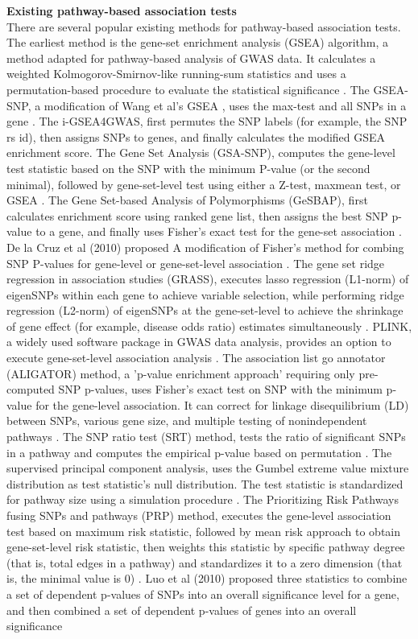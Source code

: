 \documentclass[12pt]{article}
\begin{document}
\textbf{Existing pathway-based association tests}\\
There are several popular existing methods for pathway-based association tests.  The earliest method is the gene-set enrichment analysis (GSEA) algorithm, a method adapted for pathway-based analysis of GWAS data. It calculates a weighted Kolmogorov-Smirnov-like running-sum statistics and uses a permutation-based procedure to evaluate the statistical significance \cite{wang2007pathway}. The GSEA-SNP, a modification of Wang et al's GSEA \cite{wang2007pathway}, uses the max-test and all SNPs in a gene \cite{Holden2008}. The i-GSEA4GWAS, first permutes the SNP labels (for example, the SNP rs id), then assigns SNPs to genes, and finally calculates the modified GSEA enrichment score\cite{Zhang2010a}. The Gene Set Analysis (GSA-SNP), computes the gene-level test statistic based on the SNP with the minimum P-value (or the second minimal), followed by gene-set-level test using either a Z-test, maxmean test, or GSEA \cite{Nam2010}. The Gene Set-based Analysis of Polymorphisms (GeSBAP), first calculates enrichment score using ranked gene list, then assigns the best SNP p-value to a gene, and finally uses Fisher's exact test for the gene-set association \cite{Medina2009}. De la Cruz et al (2010) proposed A modification of Fisher’s method for combing SNP P-values for gene-level or gene-set-level association \cite{DelaCruz2010}. The gene set ridge regression in association studies (GRASS), executes lasso regression (L1-norm) of eigenSNPs within each gene to achieve variable selection, while performing ridge regression (L2-norm) of eigenSNPs at the gene-set-level to achieve the shrinkage of gene effect (for example, disease odds ratio) estimates simultaneously \cite{Chen2010}. PLINK, a widely used software package in GWAS data analysis, provides an option to execute gene-set-level association analysis \cite{Purcell2007}. The association list go annotator (ALIGATOR) method, a 'p-value enrichment approach' requiring only pre-computed SNP p-values, uses Fisher's exact test on SNP with the minimum p-value for the gene-level association. It can correct for linkage disequilibrium (LD) between SNPs, various gene size, and multiple testing of nonindependent pathways \cite{Holmans2009}. The SNP ratio test (SRT) method, tests the ratio of significant SNPs in a pathway and computes the empirical p-value based on permutation \cite{ODushlaine2009}. The supervised principal component analysis, uses the Gumbel extreme value mixture distribution as test statistic's null distribution. The test statistic is standardized for pathway size using a simulation procedure \cite{Chen2010a}. The Prioritizing Risk Pathways fusing SNPs and pathways (PRP) method, executes the gene-level association test based on maximum risk statistic, followed by mean risk approach to obtain gene-set-level risk statistic, then weights this statistic by specific pathway degree (that is, total edges in a pathway) and standardizes it to a zero dimension (that is, the minimal value is 0) \cite{Chen2009}. Luo et al (2010) proposed three statistics  to combine a set of dependent p-values of SNPs into an overall significance level for a gene, and then combined a set of dependent p-values of genes into an overall significance 
\end{document}
